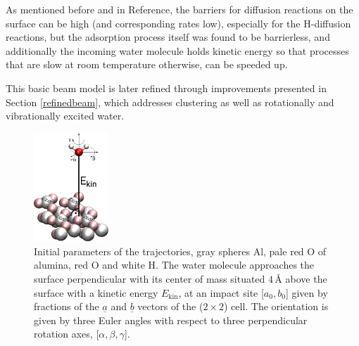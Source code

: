 \documentclass[11pt,DIV=13,BCOR=5mm,a4paper,headinclude]{scrbook}
\renewcommand{\vec}[1]{\underline{#1}}
\begin{document}
As mentioned before and in Reference\cite{WirthJPCC2012}, the barriers for diffusion reactions on the surface can be high (and corresponding rates low), especially for the H-diffusion reactions, but the adsorption process itself was found to be barrierless, and additionally the incoming water molecule holds kinetic energy so that processes that are slow at room temperature otherwise, can be speeded up.


This basic beam model is later refined through improvements presented in Section \ref{refinedbeam}, which addresses clustering as well as rotationally and vibrationally excited water.

\begin{figure}[!h]
 \centering
\includegraphics[width=0.25\textwidth]{figures/0001/perspective+h2o_new.png}
 \caption{Initial parameters of the trajectories, gray spheres Al, pale red O of alumina, red O and white H.
The water molecule approaches the surface perpendicular with its center of mass situated $4\,$\AA{} above the surface with a kinetic energy $E_\textrm{kin}$, at an impact site [$a_0,b_0$] given by fractions of the $\vec{a}$ and $\vec{b}$ vectors of the ($2\times 2$) cell.
The orientation is given by three Euler angles with respect to three perpendicular rotation axes, [$\alpha,\beta,\gamma$].}
        \label{abb:initial_parameters}
 \end{figure}
 
\end{document}
